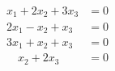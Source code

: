 \begin{align*}
x_1 + 2x_2 + 3x_3 &= 0\\
2x_1 - x_2 + x_3 &= 0\\
3x_1 + x_2 + x_3 &= 0\\
\quad x_2 + 2x_3 &= 0
\end{align*}